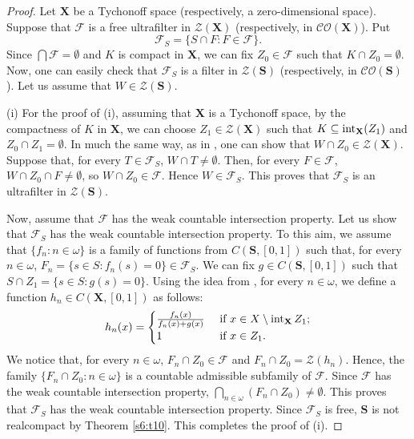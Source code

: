 \documentclass[12pt,twoside,leqno]{article}
\theoremstyle{plain}
\theoremstyle{definition}
\theoremstyle{remark}
\DeclareMathOperator{\inter}{{\rm int}}
\begin{document}
\begin{proof}
	
	Let $\mathbf{X}$ be a Tychonoff space (respectively, a zero-dimensional space). Suppose that $\mathcal{F}$ is a free ultrafilter in $\mathcal{Z}(\mathbf{X})$ (respectively, in $\mathcal{CO}(\mathbf{X})$). Put
	$$\mathcal{F}_S= \{S\cap F: F\in\mathcal{F}\}.$$
	\noindent Since $\bigcap\mathcal{F}=\emptyset$ and $K$ is compact in $\mathbf{X}$, we can fix $Z_0\in\mathcal{F}$ such that $K\cap Z_0=\emptyset$. Now, one can easily check that $\mathcal{F}_S$ is a filter in $\mathcal{Z}(\mathbf{S})$ (respectively, in $\mathcal{CO}(\mathbf{S})$). 
	Let us assume that $W\in\mathcal{Z}(\mathbf{S})$.
	
	(i) For the proof of (i), assuming that $\mathbf{X}$ is a Tychonoff space, by the compactness of $K$ in $\mathbf{X}$, we can choose $Z_1\in\mathcal{Z}(\mathbf{X})$ such that $K\subseteq \inter_{\mathbf{X}}(Z_1)$ and $Z_0\cap Z_1=\emptyset$. In much the same way, as in \cite[the proof of Fact 21]{nik}, one can show that $W\cap Z_0\in\mathcal{Z}(\mathbf{X})$. Suppose that, for every $T\in\mathcal{F}_S$, $W\cap T\neq\emptyset$. Then, for every $F\in\mathcal{F}$, $W\cap Z_0\cap F\neq\emptyset$, so $W\cap Z_0\in\mathcal{F}$. Hence $W\in\mathcal{F}_S$. This proves that $\mathcal{F}_S$ is an ultrafilter in $\mathcal{Z}(\mathbf{S})$. 
	
	Now, assume that $\mathcal{F}$ has the weak countable intersection property. Let us show that $\mathcal{F}_S$ has the weak countable intersection property. To this aim, we assume that  $\{f_n: n\in\omega\}$ is a family of functions from $C(\mathbf{S}, [0, 1])$ such that, for every $n\in\omega$, $F_n=\{s\in S: f_n(s)=0\}\in\mathcal{F}_S$. We can fix $g\in C(\mathbf{S}, [0, 1])$ such that $S\cap Z_1=\{ s\in S: g(s)=0\}$. Using the idea from \cite[the proof of Fact 21]{nik}, for every $n\in\omega$, we define a function $h_n\in C(\mathbf{X}, [0, 1])$ as follows:
	$$
	h_n(x)=\begin{cases} \frac{f_n(x)}{f_n(x)+g(x)} &\text{ if } x\in X\setminus \inter_{\mathbf{X}}Z_1;\\
		1 &\text{ if } x\in Z_1.\end{cases}
	$$
	We notice that, for every $n\in\omega$, $F_n\cap Z_0\in\mathcal{F}$ and $F_n\cap Z_0=\mathcal{Z}(h_n)$. Hence,  the family $\{F_n\cap Z_0: n\in\omega\}$ is a countable  admissible subfamily of $\mathcal{F}$. Since $\mathcal{F}$ has the weak countable intersection property, $\bigcap\limits_{n\in\omega}(F_n\cap Z_0)\neq\emptyset$. This proves that $\mathcal{F}_S$ has the weak countable intersection property. Since $\mathcal{F}_S$ is free, $\mathbf{S}$ is not realcompact by Theorem \ref{s6:t10}. This completes the proof of (i).
	

\end{proof}
\end{document}
